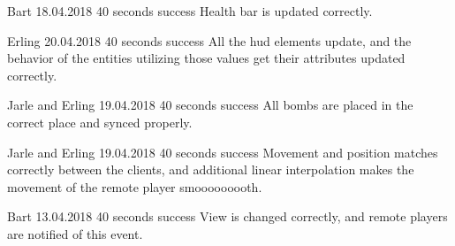 {Bart}
{18.04.2018}
{40 seconds}
{success}
{Health bar is updated correctly.}

{Erling}
{20.04.2018}
{40 seconds}
{success}
{All the \gls{hud} elements update, and the behavior of the entities utilizing those values get their attributes updated correctly.}

{Jarle and Erling}
{19.04.2018}
{40 seconds}
{success}
{All bombs are placed in the correct place and synced properly.}

{Jarle and Erling}
{19.04.2018}
{40 seconds}
{success}
{Movement and position matches correctly between the clients, and additional linear interpolation makes the movement of the remote player smooooooooth.}

{Bart}
{13.04.2018}
{40 seconds}
{success}
{View is changed correctly, and remote players are notified of this event.}
